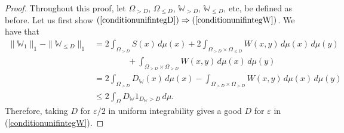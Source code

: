 \documentclass{amsart}
\numberwithin{equation}{section}
\numberwithin{figure}{section}
\theoremstyle{definition}
\theoremstyle{remark}
\newcommand{\cW}{\mathbb{W}}
\begin{document}
\begin{proof}
Throughout this proof, let $\Omega_{>D}$, $\Omega_{\le D}$, $\cW_{>D}$,
$\cW_{\le D}$, etc, be defined as before. Let us first show
$(\ref{conditionunifintegD}) \Rightarrow (\ref{conditionunifintegW})$. We
have that
\begin{align*}
\|\cW_1\|_1 - \|\cW_{\le D}\|_1 &= 2\int_{\Omega_{>D}} S(x) \,d\mu(x)+2\int_{\Omega_{>D} \times \Omega_{\le D}}W(x,y) \,d\mu(x) \,d\mu(y)\\
& \qquad \qquad \phantom{} + \int_{\Omega_{>D} \times \Omega_{>D}} W(x,y) \,d\mu(x) \,d\mu(y)\\
&=2\int_{\Omega_{>D}}D_{\cW}(x) \,d\mu(x)-\int_{\Omega_{>D} \times \Omega_{>D}} W(x,y) \,d\mu(x) \,d\mu(y)\\
& \le 2\int_\Omega D_\cW1_{D_\cW>D} \,d\mu
.
\end{align*}
Therefore, taking $D$ for $\varepsilon/2$ in uniform integrability gives a
good $D$ for $\varepsilon$ in (\ref{conditionunifintegW}).


\end{proof}
\end{document}
